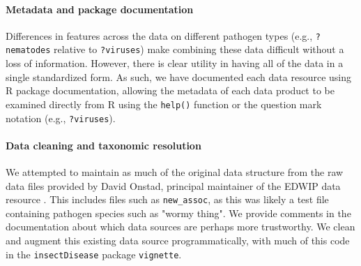 \documentclass[12pt]{article}
\begin{document}
\paragraph*{Metadata and package documentation}

Differences in features across the data on different pathogen types (e.g., \texttt{?nematodes} relative to \texttt{?viruses}) make combining these data difficult without a loss of information. However, there is clear utility in having all of the data in a single standardized form. As such, we have documented each data resource using R package documentation, allowing the metadata of each data product to be examined directly from R using the \texttt{help()} function or the question mark notation (e.g., \texttt{?viruses}). 














\paragraph*{Data cleaning and taxonomic resolution}

We attempted to maintain as much of the original data structure from the raw data files provided by David Onstad, principal maintainer of the EDWIP data resource \citep{onstad1997}. This includes files such as \texttt{new\_assoc}, as this was likely a test file containing pathogen species such as "wormy thing". We provide comments in the documentation about which data sources are perhaps more trustworthy. We clean and augment this existing data source programmatically, with much of this code in the \texttt{insectDisease} package \texttt{vignette}.
\end{document}
